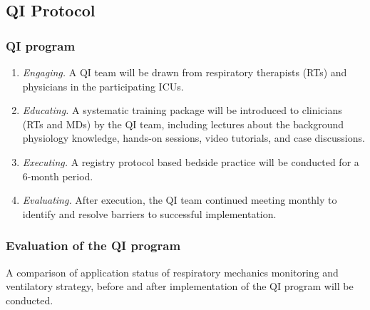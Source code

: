 \documentclass[11pt]{article} %
\begin{document}
\subsection{QI Protocol}

\subsubsection{QI program}

\begin{enumerate}[label=(\alph*)]
\item \textit{Engaging.} A QI team will be drawn from respiratory therapists (RTs) and physicians in the participating ICUs.
\item \textit{Educating. }A systematic training package will be introduced to clinicians (RTs and MDs) by the QI team, including lectures about the background physiology knowledge, hands-on sessions, video tutorials, and case discussions.
\item \textit{Executing.} A registry protocol based bedside practice will be conducted for a 6-month period.
\item \textit{Evaluating.} After execution, the QI team continued meeting monthly to identify and resolve barriers to successful implementation.
\end{enumerate}

\subsubsection{Evaluation of the QI program}
A comparison of application status of respiratory mechanics monitoring and ventilatory strategy, before and after implementation of the QI program will be conducted.
\end{document}
